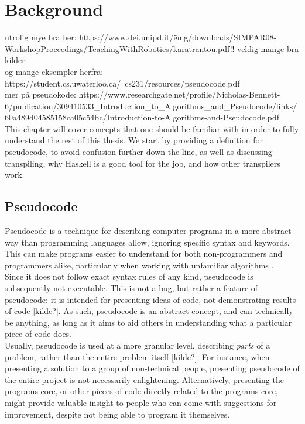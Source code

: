 \chapter{Background} %

utrolig mye bra her: https://www.dei.unipd.it/\~emg/downloads/SIMPAR08-WorkshopProceedings/TeachingWithRobotics/karatrantou.pdf!! veldig mange bra kilder \hfill \\

og mange eksempler herfra: https://student.cs.uwaterloo.ca/~cs231/resources/pseudocode.pdf \hfill \\

mer på pseudokode: https://www.researchgate.net/profile/Nicholas-Bennett-6/publication/309410533\_Introduction\_to\_Algorithms\_and\_Pseudocode/links/60a489d04585158ca05c54bc/Introduction-to-Algorithms-and-Pseudocode.pdf \hfill \\

This chapter will cover concepts that one should be familiar with in order to fully understand the rest of this thesis. We start by providing a definition for pseudocode, to avoid confusion further down the line, as well as discussing transpiling, why Haskell is a good tool for the job, and how other transpilers work.

\section{Pseudocode}

Pseudocode is a technique for describing computer programs in a more abstract way than programming languages allow, ignoring specific syntax and keywords. This can make programs easier to understand for both non-programmers and programmers alike, particularly when working with unfamiliar algorithms \cite{LinfoAlgorithmsIntro2007}. \hfill \\

Since it does not follow exact syntax rules of any kind, pseudocode is subsequently not executable. This is not a bug, but rather a feature of pseudocode: it is intended for presenting ideas of code, not demonstrating results of code [kilde?]. As such, pseudocode is an abstract concept, and can technically be anything, as long as it aims to aid others in understanding what a particular piece of code does. \hfill \\

Usually, pseudocode is used at a more granular level, describing \textit{parts} of a problem, rather than the entire problem itself [kilde?]. For instance, when presenting a solution to a group of non-technical people, presenting pseudocode of the entire project is not necessarily enlightening. Alternatively, presenting the programs core, or other pieces of code directly related to the programs core, might provide valuable insight to people who can come with suggestions for improvement, despite not being able to program it themselves. \hfill \\

